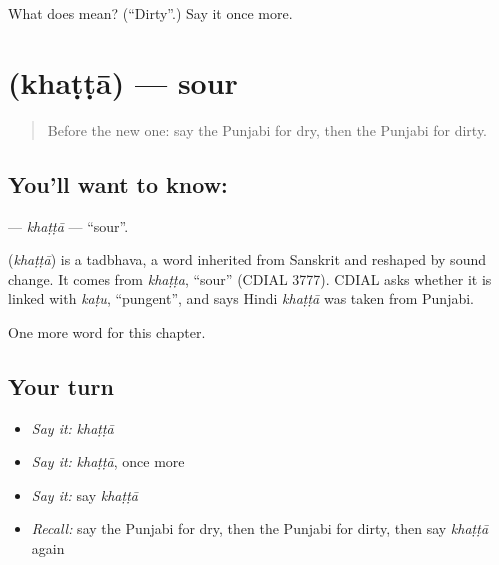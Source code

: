 \begin{tcolorbox}[breakable,colback=teal!4,colframe=teal!35!black,title={Before you move on}]
What does  mean? (\textquotedblleft{}Dirty\textquotedblright{}.) Say it once more.
\end{tcolorbox}
\section[\texorpdfstring{\pa{ਖੱਟਾ} (khaṭṭā)}{ਖੱਟਾ (khaṭṭā)}]{ (khaṭṭā) — sour}

\label{lesson:PA-C143-khatta}



\begin{quote}
Before the new one: say the Punjabi for dry, then the Punjabi for dirty.
\end{quote}

\subsection*{You'll want to know: }
\textbf{} — \emph{khaṭṭā} — \textquotedblleft{}sour\textquotedblright{}.

\begin{cousinweb}
\textbf{} (\emph{khaṭṭā}) is a tadbhava, a word inherited from Sanskrit and reshaped by sound change. It comes from \emph{khaṭṭa}, \textquotedblleft{}sour\textquotedblright{} (CDIAL 3777). CDIAL asks whether it is linked with \emph{kaṭu}, \textquotedblleft{}pungent\textquotedblright{}, and says Hindi \emph{khaṭṭā} was taken from Punjabi.
\end{cousinweb}

\begin{grammarlens}[title={What you've built}]
One more word for this chapter.
\end{grammarlens}

\subsection*{Your turn}
\begin{itemize}
\raggedright
  \item \emph{Say it:} \emph{khaṭṭā}
  \item \emph{Say it:} \emph{khaṭṭā}, once more
  \item \emph{Say it:} say \emph{khaṭṭā}
  \item \emph{Recall:} say the Punjabi for dry, then the Punjabi for dirty, then say \emph{khaṭṭā} again
\end{itemize}

